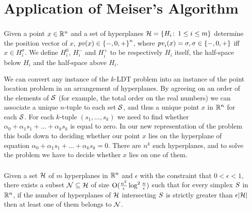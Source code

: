 \documentclass[10pt,xcolor=x11names,dvipsnames,hyperref={colorlinks=false,breaklinks=true,bookmarks=true}]{beamer}
\begin{document}
\section{Application of Meiser's Algorithm}
\begin{frame}\frametitle{\insertsection}\justifying
\begin{probl}
Given a point $x \in \R^n$ and a set of hyperplanes $\H = \enum{ H_i
\st 1 \leq i \leq m }$ determine the position vector of $x$, $\pv(x) \in
\signset^n$, where $\pv_i(x) = \sigma, \sigma \in \signset$ iff $x \in
H_i^{\sigma}$. We define $H_i^{0}$, $H_i^{-}$ and $H_i^{+}$ to be
respectively $H_i$ itself, the half-space below $H_i$ and the half-space above
$H_i$.
\end{probl}\pause
We can convert any instance of the \(k\)-\textsf{LDT} problem into an
instance of the point location problem in an arrangement of hyperplanes.
By agreeing on an order of the elements of \(\S\) (for example, the total order on
the real numbers) we can associate a unique \(n\)-tuple to each set \(\S\),
and thus a unique point \(x\) in \(\R^n\) for each \(\S\).
For each \(k\)-tuple \((s_1, \ldots, s_k)\) we need to find whether
\(\alpha_0 + \alpha_1 s_1 + \dots + \alpha_k s_k\)
is equal to zero. In our new representation of the problem this
boils down to deciding whether our point \(x\) lies on the hyperplane of
equation \(\alpha_0 + \alpha_1 s_1 + \dots + \alpha_k s_k = 0\). There are \(n^k\) such
hyperplanes, and to solve the problem
we have to decide whether \(x\) lies on one of them.
\end{frame}


\begin{frame}\frametitle{\insertsection}\justifying
\begin{thm}[(Clarkson)]\label{thm:meiser:clarkson}
Given a set $\H$ of $m$ hyperplanes in $\R^n$ and $\epsilon$ with the
constraint that $0 < \epsilon < 1$, there exists a subset $\NH \subseteq \H$ of
size $\BigO{\enetsize}$ such that for every simplex $\simplex$ in $\R^n$, if the
number of hyperplanes of $\H$ intersecting $\simplex$ is strictly greater than
$\epsilon \card{\H}$ then at least one of them belongs to $\NH$.
\end{thm}\pause
\begin{overlayarea}{\textwidth}{0.4\textheight}
\end{overlayarea}
\end{frame}
\end{document}
